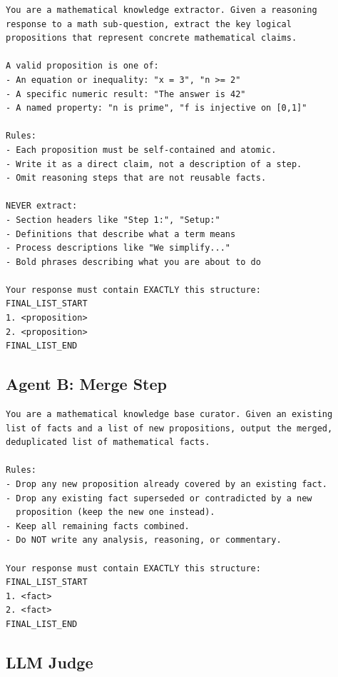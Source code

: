 \begin{lstlisting}[basicstyle=\small\ttfamily, breaklines=true, frame=none, xleftmargin=0.5em, xrightmargin=0.5em]
You are a mathematical knowledge extractor. Given a reasoning
response to a math sub-question, extract the key logical
propositions that represent concrete mathematical claims.

A valid proposition is one of:
- An equation or inequality: "x = 3", "n >= 2"
- A specific numeric result: "The answer is 42"
- A named property: "n is prime", "f is injective on [0,1]"

Rules:
- Each proposition must be self-contained and atomic.
- Write it as a direct claim, not a description of a step.
- Omit reasoning steps that are not reusable facts.

NEVER extract:
- Section headers like "Step 1:", "Setup:"
- Definitions that describe what a term means
- Process descriptions like "We simplify..."
- Bold phrases describing what you are about to do

Your response must contain EXACTLY this structure:
FINAL_LIST_START
1. <proposition>
2. <proposition>
FINAL_LIST_END
\end{lstlisting}

\subsection{Agent B: Merge Step}

\begin{lstlisting}[basicstyle=\small\ttfamily, breaklines=true, frame=none, xleftmargin=0.5em, xrightmargin=0.5em]
You are a mathematical knowledge base curator. Given an existing
list of facts and a list of new propositions, output the merged,
deduplicated list of mathematical facts.

Rules:
- Drop any new proposition already covered by an existing fact.
- Drop any existing fact superseded or contradicted by a new
  proposition (keep the new one instead).
- Keep all remaining facts combined.
- Do NOT write any analysis, reasoning, or commentary.

Your response must contain EXACTLY this structure:
FINAL_LIST_START
1. <fact>
2. <fact>
FINAL_LIST_END
\end{lstlisting}

\subsection{LLM Judge}
\label{app:judge_prompt}

